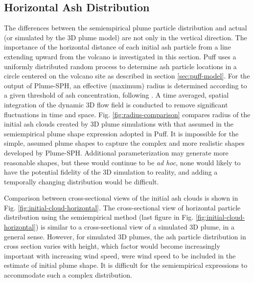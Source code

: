 \documentclass[utf8]{frontiersSCNS} %
\begin{document}
\subsection{Horizontal Ash Distribution}

The differences between the semiempirical plume particle distribution and actual (or simulated by the 3D plume model) are not only in the vertical direction. The importance of the horizontal distance of each initial ash particle from a line extending upward from the volcano is investigated in this section.  Puff uses a uniformly distributed random process to determine ash particle locations in a circle centered on the volcano site as described in section \ref{sec:puff-model}. For the output of Plume-SPH, an effective (maximum) radius is determined according to a given threshold of ash concentration, following \citet {cerminara2016large}. A time averaged, spatial integration of the dynamic 3D flow field is conducted to remove significant fluctuations in time and space. Fig. \ref{fig:radius-comparison} compares radius of the initial ash clouds created by 3D plume simulations with that assumed in the semiempirical plume shape expression adopted in Puff. It is impossible for the simple, assumed plume shapes to capture the complex and more realistic shapes developed by  Plume-SPH. Additional parameterization may generate more reasonable shapes, but these would continue to be \textit{ad hoc}, none would likely to have the potential fidelity of the 3D simulation to reality, and adding a temporally changing distribution would be difficult.

Comparison between cross-sectional views of the initial ash clouds is shown in Fig. \ref{fig:initial-cloud-horizontal}. The cross-sectional view of horizontal particle distribution using the semiempirical method (last figure in Fig. \ref{fig:initial-cloud-horizontal}) is similar to a cross-sectional view of a simulated 3D plume, in a general sense. However, for simulated 3D plumes, the ash particle distribution in cross section varies with height, which factor would become increasingly important with increasing wind speed, were wind speed to be included in the estimate of initial plume shape. It is difficult for the semiempirical expressions to accommodate such a complex distribution.
\end{document}

